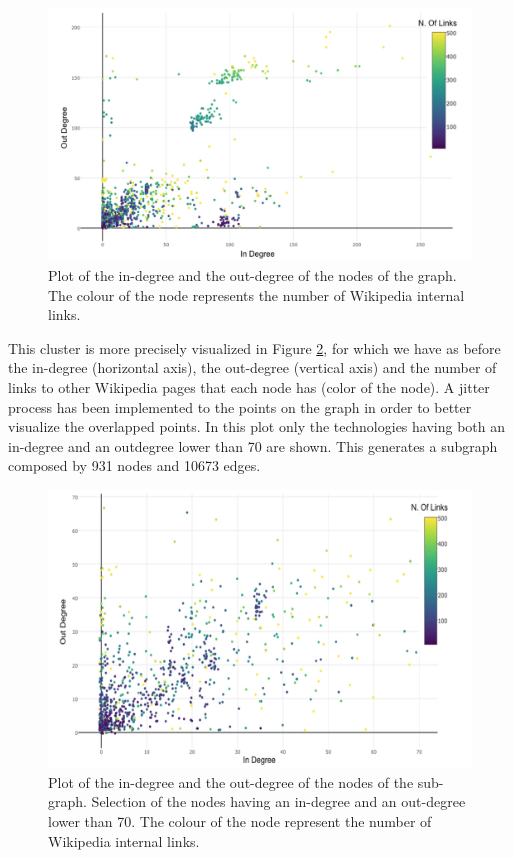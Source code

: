 \documentclass[b5paper,]{book}
\theoremstyle{definition}
\theoremstyle{definition}
\theoremstyle{definition}
\theoremstyle{remark}
\begin{document}
\begin{figure}

{\centering \includegraphics[width=1\linewidth]{_bookdown_files/figures/techgraphplot1} 

}

\caption{Plot of the in-degree and the out-degree of the nodes of the graph. The colour of the node represents the number of Wikipedia internal links.}\label{fig:techgraphplot1}
\end{figure}

This cluster is more precisely visualized in Figure
\ref{fig:techgraphplot2}, for which we have as before the in-degree
(horizontal axis), the out-degree (vertical axis) and the number of
links to other Wikipedia pages that each node has (color of the node). A
jitter process has been implemented to the points on the graph in order
to better visualize the overlapped points. In this plot only the
technologies having both an in-degree and an outdegree lower than 70 are
shown. This generates a subgraph composed by 931 nodes and 10673 edges.

\begin{figure}

{\centering \includegraphics[width=1\linewidth]{_bookdown_files/figures/techgraphplot2} 

}

\caption{Plot of the in-degree and the out-degree of the nodes of the sub-graph. Selection of the nodes having an in-degree and an out-degree lower than 70. The colour of the node represent the number of Wikipedia internal links.}\label{fig:techgraphplot2}
\end{figure}
\end{document}
